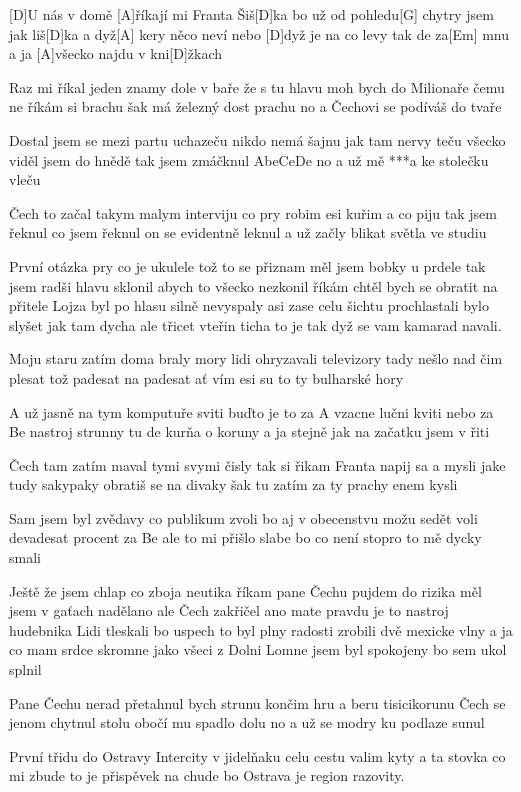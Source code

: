 
[D]U nás v domě [A]\null říkají mi Franta Šiš[D]ka
bo už od pohledu[G] chytry jsem jak liš[D]ka
a dyž[A] kery něco neví
nebo [D]dyž je na co levy
tak de za[Em] mnu a ja [A]všecko najdu v kni[D]\null žkach

Raz mi říkal jeden znamy dole v baře
že s tu hlavu moh bych do Milionaře
čemu ne říkám si brachu
šak má železný dost prachu
no a Čechovi se podíváš do tvaře

Dostal jsem se mezi partu uchazeču
nikdo nemá šajnu jak tam nervy teču
všecko viděl jsem do hnědě
tak jsem zmáčknul AbeCeDe
no a už mě ***a ke stolečku vleču

Čech to začal takym malym interviju
co pry robim esi kuřim a co piju
tak jsem řeknul co jsem řeknul
on se evidentně leknul
a už začly blikat světla ve studiu

První otázka pry co je ukulele
tož to se přiznam měl jsem bobky u prdele
tak jsem radši hlavu sklonil
abych to všecko nezkonil
říkám chtěl bych se obratit na přitele 
\slpc
Lojza byl po hlasu silně nevyspaly
asi zase celu šichtu prochlastali
bylo slyšet jak tam dycha
ale třicet vteřin ticha
to je tak dyž se vam kamarad navali.

Moju staru zatím doma braly mory
lidi ohryzavali televizory
tady nešlo nad čim plesat
tož padesat na padesat
ať vím esi su to ty bulharské hory

A už jasně na tym komputuře sviti
buďto je to za A vzacne lučni kviti
nebo za Be nastroj strunny
tu de kurňa o koruny
a ja stejně jak na začatku jsem v řiti

Čech tam zatím maval tymi svymi čisly
tak si řikam Franta napij sa a mysli
jake tudy sakypaky
obratiš se na divaky
šak tu zatím za ty prachy enem kysli

Sam jsem byl zvědavy co publikum zvoli
bo aj v obecenstvu možu sedět voli
devadesat procent za Be
ale to mi přišlo slabe
bo co není stopro to mě dycky smali

Ještě že jsem chlap co zboja neutika
říkam pane Čechu pujdem do rizika
měl jsem v gaťach nadělano
ale Čech zakřičel ano
mate pravdu je to nastroj hudebnika
\slpc
Lidi tleskali bo uspech to byl plny
radosti zrobili dvě mexicke vlny
a ja co mam srdce skromne
jako všeci z Dolni Lomne
jsem byl spokojeny bo sem ukol splnil

Pane Čechu nerad přetahnul bych strunu
končim hru a beru tisicikorunu
Čech se jenom chytnul stolu
obočí mu spadlo dolu
no a už se modry ku podlaze sunul

První třidu do Ostravy Intercity
v jidelňaku celu cestu valim kyty
a ta stovka co mi zbude
to je přispěvek na chude
bo Ostrava je region razovity.
